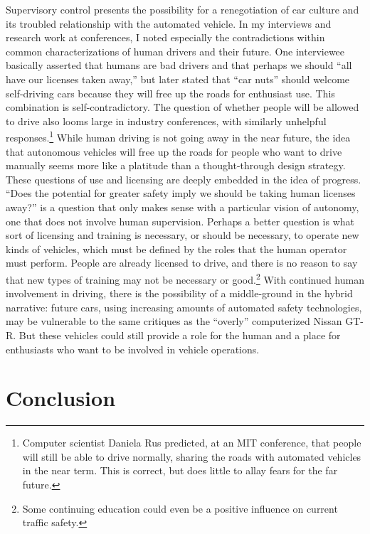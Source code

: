 Supervisory control presents the possibility for a
renegotiation of car 
culture and its troubled relationship with the automated vehicle. In
my interviews and research work at conferences, I noted especially the
contradictions within common characterizations of human
drivers and their future. One interviewee basically asserted that
humans are bad drivers and that perhaps we should ``all have our
licenses taken away,'' but later stated that ``car nuts'' should
welcome self-driving cars because they will free up the roads for
enthusiast use. This combination is self-contradictory. The
question of whether people will be allowed to drive also looms large
in industry conferences, with similarly unhelpful
responses.\footnote{Computer scientist Daniela Rus predicted, at an MIT 
conference, that people will still be able to
drive normally, sharing the roads with automated vehicles in the near
term. This is correct, but does little to allay fears for the far future.} While
human driving is not going away in the near future, the idea that
autonomous vehicles will free up the roads for people who want to
drive manually seems more like a platitude than a thought-through
design strategy. These questions of use and licensing are deeply embedded in the idea
of progress. ``Does the potential for greater safety imply we should be
taking human licenses away?'' is a question that only makes
sense with a particular vision of autonomy, one that does not involve
human supervision. Perhaps a better question is what sort of licensing
and training is necessary, or should be necessary, to operate new
kinds of vehicles, which must be defined by the roles that the human
operator must perform. People are already licensed to drive, and there is no reason to
say that new types of training may not be necessary or good.\footnote{
Some continuing education could even be a positive
influence on current traffic safety.} With continued human
involvement in driving, there is 
the possibility of a
middle-ground in the hybrid narrative:  future cars, using increasing
amounts of automated safety technologies,
may be vulnerable to the same critiques as the ``overly'' computerized Nissan GT-R. But these
vehicles could still provide a role for the human and a place for
enthusiasts who want to be involved in vehicle operations.

\section{Conclusion}

